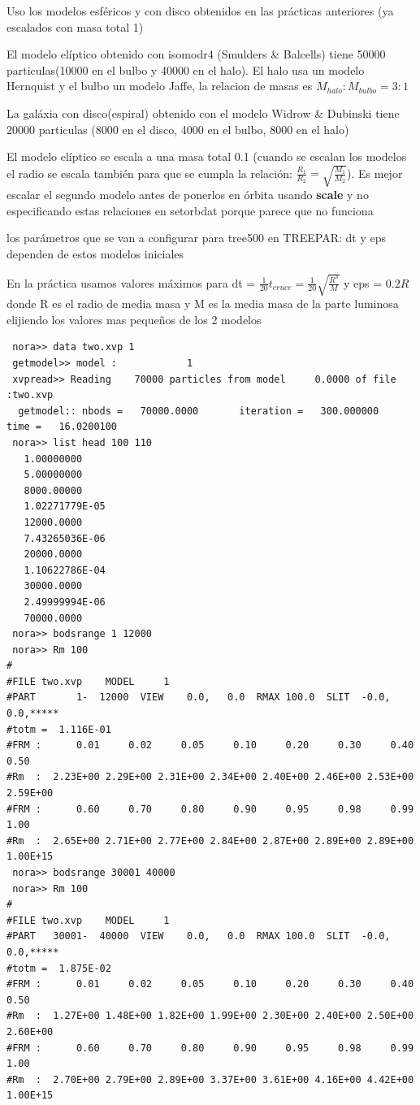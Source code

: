 \documentclass[12pt]{article} %
\renewcommand{\=}[1]{\stackrel{#1}{=}} %
\theoremstyle{definition}
\theoremstyle{remark}
\begin{document}
\begin{description}
\item Uso los modelos esféricos y con disco obtenidos en las prácticas anteriores (ya escalados con masa total 1)
\item El modelo elíptico obtenido con isomodr4 (Smulders \& Balcells) tiene 50000 particulas(10000 en el bulbo y 40000 en el halo). El halo usa un modelo Hernquist y el bulbo un modelo Jaffe, la relacion de masas es $M_{halo}:M_{bulbo} = 3:1$
\item La galáxia con disco(espiral) obtenido con el modelo Widrow \& Dubinski tiene 20000 particulas (8000 en el disco, 4000 en el bulbo, 8000 en el halo) 
\item El modelo elíptico se escala a una masa total 0.1 (cuando se escalan los modelos el radio se escala también para que se cumpla la relación: $\frac{R_1}{R_2} = \sqrt{\frac{M_1}{M_2}}$). Es mejor escalar el segundo modelo antes de ponerlos en órbita usando \textbf{scale} y no especificando estas relaciones en setorbdat porque parece que no funciona
\item los parámetros que se van a configurar para tree500 en TREEPAR: dt y eps dependen de estos modelos iniciales
\begin{description}
\item En la práctica usamos valores máximos para  dt = $\frac{1}{20} t_{cruce} = \frac{1}{20} \sqrt{\frac{R^3}{M}}$ y eps = $0.2 R$ donde R es el radio de media masa y M es la media masa de la parte luminosa elijiendo los valores mas pequeños de los 2 modelos
\item
\small
\begin{verbatim}
 nora>> data two.xvp 1
 getmodel>> model :            1
 xvpread>> Reading    70000 particles from model     0.0000 of file :two.xvp                                 
  getmodel:: nbods =   70000.0000       iteration =   300.000000       time =   16.0200100    
 nora>> list head 100 110
   1.00000000    
   5.00000000    
   8000.00000    
   1.02271779E-05
   12000.0000    
   7.43265036E-06
   20000.0000    
   1.10622786E-04
   30000.0000    
   2.49999994E-06
   70000.0000    
 nora>> bodsrange 1 12000
 nora>> Rm 100
#
#FILE two.xvp    MODEL     1                                                    
#PART       1-  12000  VIEW    0.0,   0.0  RMAX 100.0  SLIT  -0.0, 0.0,*****    
#totm =  1.116E-01
#FRM :      0.01     0.02     0.05     0.10     0.20     0.30     0.40     0.50
#Rm  :  2.23E+00 2.29E+00 2.31E+00 2.34E+00 2.40E+00 2.46E+00 2.53E+00 2.59E+00
#FRM :      0.60     0.70     0.80     0.90     0.95     0.98     0.99     1.00
#Rm  :  2.65E+00 2.71E+00 2.77E+00 2.84E+00 2.87E+00 2.89E+00 2.89E+00 1.00E+15
 nora>> bodsrange 30001 40000
 nora>> Rm 100
#
#FILE two.xvp    MODEL     1                                                    
#PART   30001-  40000  VIEW    0.0,   0.0  RMAX 100.0  SLIT  -0.0, 0.0,*****    
#totm =  1.875E-02
#FRM :      0.01     0.02     0.05     0.10     0.20     0.30     0.40     0.50
#Rm  :  1.27E+00 1.48E+00 1.82E+00 1.99E+00 2.30E+00 2.40E+00 2.50E+00 2.60E+00
#FRM :      0.60     0.70     0.80     0.90     0.95     0.98     0.99     1.00
#Rm  :  2.70E+00 2.79E+00 2.89E+00 3.37E+00 3.61E+00 4.16E+00 4.42E+00 1.00E+15


\end{verbatim}
\end{description}
\end{description}
\end{document}
